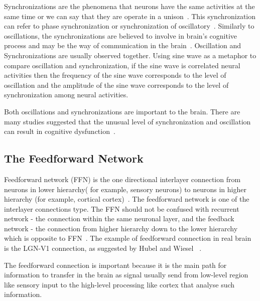 Synchronizations are the phenomena that neurons have the same activities at the same time or we can say that they are operate in a unison~\cite{ward2003synchronous}. This synchronization can refer to phase synchronization or synchronization of oscillatory~\cite{varela2001brainweb, gray1996chattering, salinas2001correlated}.  Similarly to oscillations, the synchronizations are believed to involve in brain's cognitive process and may be the way of communication in the brain~\cite{ward2003synchronous, fries2001modulation, engel2001dynamic, womelsdorf2007modulation}. Oscillation and Synchronizations are usually observed together. Using sine wave as a metaphor to compare oscillation and synchronization, if the sine wave is correlated neural activities then the frequency of the sine wave corresponds to the level of oscillation and the amplitude of the sine wave corresponds to the level of synchronization among neural activities.

Both oscillations and synchronizations are important to the brain. There are many studies suggested that the unusual level of synchronization and oscillation can result in cognitive dysfunction~\cite{uhlhaas2010abnormal, grice2001disordered, hammond2007pathological,dinstein2011disrupted, uhlhaas2006neural, schnitzler2005normal, bacsar2008review}.



\subsection{The Feedforward Network}

Feedforward network (FFN) is the one directional interlayer connection from neurons in lower hierarchy( for example, sensory neurons) to neurons in higher hierarchy (for example, cortical cortex)~\cite{felleman1991distributed, kumar2010spiking}.
The feedforward network is one of the interlayer connections type. The FFN should not be confused with recurrent network - the connection within the same neuronal layer, and the feedback network - the connection from higher hierarchy down to the lower hierarchy which is opposite to FFN~\cite{carnevale2006neuron, Bower2003Genesis, Kandel5thEdition}. 
The example of feedforward connection in real brain is the LGN-V1 connection, as suggested by Hubel and Wiesel ~\cite{hubel1962receptive}.

The feedforward connection is important because it is the main path for information to transfer in the brain as signal usually send from low-level region like sensory input to the high-level processing like cortex that analyse such information. 


